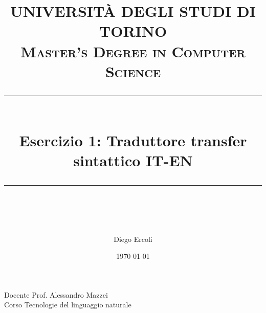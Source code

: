 \documentclass{article} %
\title{
	\normalfont \normalsize 
		\textsc{\textbf{UNIVERSITÀ DEGLI STUDI DI TORINO} \\ 
		Master's Degree in Computer Science} \\
	[10pt] 
	\rule{\linewidth}{0.5pt} \\[6pt] 
	\large Esercizio 1: Traduttore transfer sintattico IT-EN\\
	\rule{\linewidth}{2pt}  \\[10pt]
}
\author{Diego Ercoli}
\date{\today}
\begin{document}
	
	\maketitle
	\noindent
	Docente \dotfill Prof. Alessandro Mazzei \\
	Corso \dotfill Tecnologie del linguaggio naturale  \\

	
		

	
	
	
%	
	

	\newpage
	
	
\end{document}

